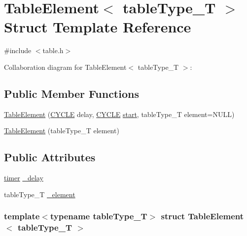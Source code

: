 \hypertarget{structTableElement}{
\section{TableElement$<$ tableType\_\-T $>$ Struct Template Reference}
\label{structTableElement}
}


{\ttfamily \#include $<$table.h$>$}



Collaboration diagram for TableElement$<$ tableType\_\-T $>$:
\subsection*{Public Member Functions}
\begin{DoxyCompactItemize}
\item 
\hyperlink{structTableElement_a4ea30cdbfb27a82488fd8fb422777f74}{TableElement} (\hyperlink{global_2global_8h_a7e19a550ec11d1ed921deb20c22efb5b}{CYCLE} delay, \hyperlink{global_2global_8h_a7e19a550ec11d1ed921deb20c22efb5b}{CYCLE} \hyperlink{bkEnd_8cpp_ada310e7f72b38fadd4b24d80ed3438ee}{start}, tableType\_\-T element=NULL)
\item 
\hyperlink{structTableElement_aee053def7c4abbfacd0349d5e6f213e0}{TableElement} (tableType\_\-T element)
\end{DoxyCompactItemize}
\subsection*{Public Attributes}
\begin{DoxyCompactItemize}
\item 
\hyperlink{structtimer}{timer} \hyperlink{structTableElement_a360409caa18be13ff49eb33b9761ef51}{\_\-delay}
\item 
tableType\_\-T \hyperlink{structTableElement_a00a6de9a65467916319e8fd276f8f3f9}{\_\-element}
\end{DoxyCompactItemize}
\subsubsection*{template$<$typename tableType\_\-T$>$ struct TableElement$<$ tableType\_\-T $>$}



